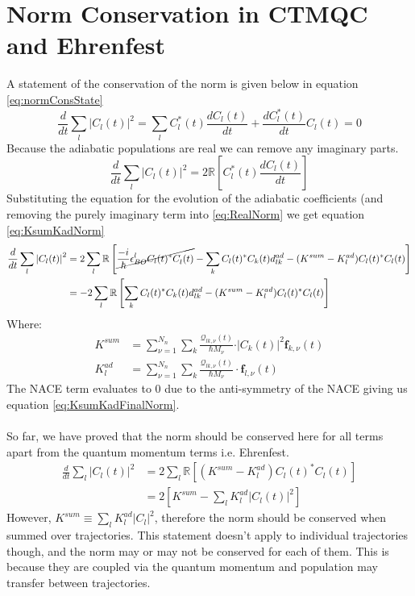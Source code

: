 \chapter{Norm Conservation in CTMQC and Ehrenfest}
\label{app:norm_cons}
A statement of the conservation of the norm is given below in equation \eqref{eq:normConsState}
\begin{equation}
	\frac{d}{dt} \sum_{l} \left\vert C_{l}(t) \right\vert^2 = \sum_{l} C_{l}^{*}(t)\frac{d C_{l}(t)}{dt} + \frac{d C_{l}^{*}(t)}{dt}C_{l}(t)
	\label{eq:normConsState} = 0
\end{equation}
Because the adiabatic populations are real we can remove any imaginary parts.
\begin{equation}
	\frac{d}{dt} \sum_{l} \left\vert C_{l}(t) \right\vert^2 = 2 \mathbb{R} \left[ C_{l}^{*}(t) \frac{d C_{l}(t)}{dt} \right]
	\label{eq:RealNorm}
\end{equation}
Substituting the equation for the evolution of the adiabatic coefficients (and removing the purely imaginary term into \eqref{eq:RealNorm} we get equation \eqref{eq:KsumKadNorm}
\begin{align}
	\frac{d}{dt} \sum_{l} \left\vert C_{l}(t) \right\vert^2 &= 2 \sum_{l} \mathbb{R} \left[ \cancel{\frac{-i}{\hbar} \epsilon_{BO}^{l} C_l(t)^*C_l^{}(t)}
	- \sum_{k} C_l(t)^*C_k(t) d_{lk}^{ad} - (K^{sum} - K^{ad}_{l}) C_l(t)^*C_l(t)  \right]
	\\
	&= -2 \sum_{l} \mathbb{R} \left[ \sum_{k} C_l(t)^*C_k(t) d_{lk}^{ad} - (K^{sum} - K^{ad}_{l}) C_l(t)^*C_l(t)  \right]
	\label{eq:KsumKadNorm}
\end{align}
Where:
\begin{align}
	K^{sum} &= \sum_{\nu = 1}^{N_n} \sum_{k} \frac{\mathcal{Q}_{lk, \nu}(t)}{\hbar M_\nu}\cdot \vert C_k(t) \vert^2 \mathbf{f}_{k, \nu}(t) \\
	K^{ad}_{l} &= \sum_{\nu = 1}^{N_n} \sum_{k} \frac{\mathcal{Q}_{lk, \nu}(t)}{\hbar M_\nu}\cdot \mathbf{f}_{l, \nu}(t)
\end{align}
The NACE term evaluates to 0 due to the anti-symmetry of the NACE giving us equation \eqref{eq:KsumKadFinalNorm}. 
\\\\
So far, we have proved that the norm should be conserved here for all terms apart from the quantum momentum terms i.e. Ehrenfest.
\begin{align}
	\frac{d}{dt} \sum_{l} \left\vert C_{l}(t) \right\vert^2 &= 2 \sum_{l} \mathbb{R} \left[ (K^{sum} - K^{ad}_{l}) C_l(t)^*C_l(t)  \right] \\
	&= 2 \left[ K^{sum} - \sum_{l} K^{ad}_{l} \vert C_{l}(t) \vert^2 \right]
	\label{eq:KsumKadFinalNorm}
\end{align}
However, $K^{sum} \equiv \sum_{l} K^{ad}_{l} |C_{l}|^2$, therefore the norm should be conserved when summed over trajectories. This statement doesn't apply to individual trajectories though, and the norm may or may not be conserved for each of them. This is because they are coupled via the quantum momentum and population may transfer between trajectories.
\newpage
